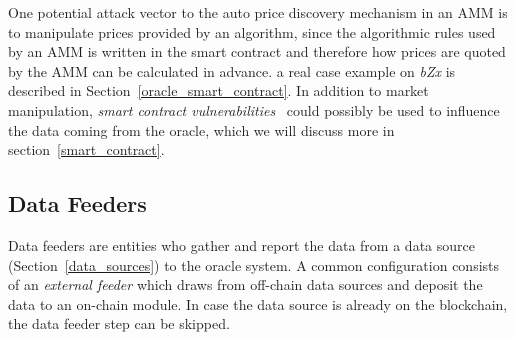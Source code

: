 
One potential attack vector to the auto price discovery mechanism in an AMM is to manipulate prices provided by an algorithm, since the algorithmic rules used by an AMM is written in the smart contract and therefore how prices are quoted by the AMM can be calculated in advance. a real case example on \textit{bZx} is described in Section~\ref{oracle_smart_contract}. In addition to market manipulation, \textit{smart contract vulnerabilities}~\cite{atzei2017survey,chen2020survey} could possibly be used to influence the data coming from the oracle, which we will discuss more in section~\ref{smart_contract}.





\subsection{Data Feeders}\label{data_feeders} 

Data feeders are entities who gather and report the data from a data source (Section~\ref{data_sources}) to the oracle system. 
A common configuration consists of an \textit{external feeder} which draws from off-chain data sources and deposit the data to an on-chain module. In case the data source is already on the blockchain, the data feeder step can be skipped.

